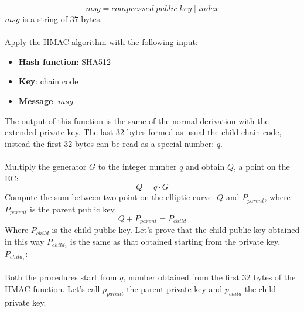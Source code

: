 \begin{equation*}
msg = compressed \; public\;key \;|\; index
\end{equation*}
$msg$ is a string of $37$ bytes. \\ \\
Apply the HMAC algorithm with the following input:

\begin{itemize}[label=$\odot$]
	\item \textbf{Hash function}: SHA512
	\item \textbf{Key}: chain code
	\item \textbf{Message}: $msg$
\end{itemize}
The output of this function is the same of the normal derivation with the extended private key. The last 32 bytes formed as usual the child chain code, instead the first 32 bytes can be read as a special number: $q$. \\ \\
Multiply the generator $G$ to the integer number $q$ and obtain $Q$, a point on the EC:
\begin{equation*}
Q=q\cdot G
\end{equation*}
Compute the sum between two point on the elliptic curve: $Q$ and $P_{parent}$, where $P_{parent}$ is the parent public key.
\begin{equation*}
Q+P_{parent}=P_{child}
\end{equation*}
Where $P_{child}$ is the child public key. Let's prove that the child public key obtained in this way $P_{child_2}$ is the same as that obtained starting from the private key, $P_{child_1}$:
\\ \\
Both the procedures start from $q$, number obtained from the first 32 bytes of the HMAC function. Let's call $p_{parent}$ the parent private key and $p_{child}$ the child private key.

